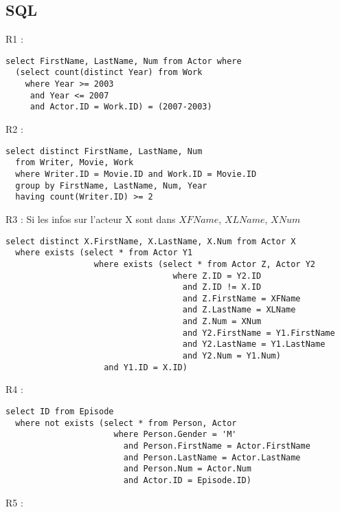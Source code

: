 \documentclass[a4paper,12pt]{article}
\begin{document}
\subsection{SQL}
\begin{list}{-}{}
  \item R1 :
    \begin{lstlisting}
select FirstName, LastName, Num from Actor where
  (select count(distinct Year) from Work
    where Year >= 2003
     and Year <= 2007
     and Actor.ID = Work.ID) = (2007-2003)
    \end{lstlisting}
  \item R2 :
    \begin{lstlisting}
select distinct FirstName, LastName, Num
  from Writer, Movie, Work
  where Writer.ID = Movie.ID and Work.ID = Movie.ID
  group by FirstName, LastName, Num, Year
  having count(Writer.ID) >= 2
    \end{lstlisting}
  \item R3 :
    Si les infos sur l'acteur X sont dans $XFName$, $XLName$, $XNum$
    \begin{lstlisting}
select distinct X.FirstName, X.LastName, X.Num from Actor X
  where exists (select * from Actor Y1
                  where exists (select * from Actor Z, Actor Y2 
                                  where Z.ID = Y2.ID
                                    and Z.ID != X.ID
                                    and Z.FirstName = XFName
                                    and Z.LastName = XLName
                                    and Z.Num = XNum
                                    and Y2.FirstName = Y1.FirstName
                                    and Y2.LastName = Y1.LastName
                                    and Y2.Num = Y1.Num)
                    and Y1.ID = X.ID)
    \end{lstlisting}
  \item R4 :
    \begin{lstlisting}
select ID from Episode
  where not exists (select * from Person, Actor
                      where Person.Gender = 'M'
                        and Person.FirstName = Actor.FirstName
                        and Person.LastName = Actor.LastName
                        and Person.Num = Actor.Num
                        and Actor.ID = Episode.ID)
    \end{lstlisting}
  \item R5 :

\end{list}
\end{document}
